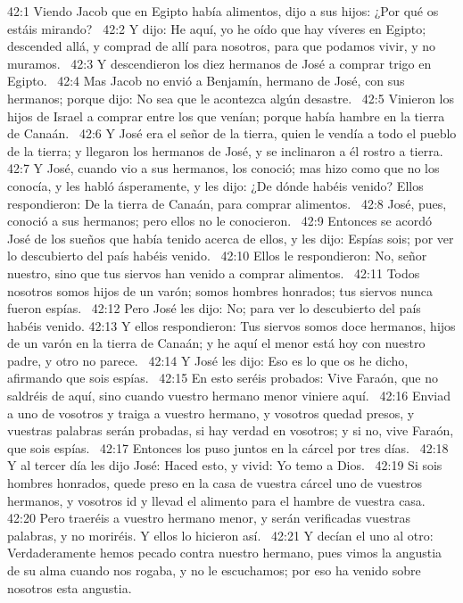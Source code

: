 42:1 Viendo Jacob que en Egipto había alimentos, dijo a sus hijos: ¿Por qué os estáis mirando?  
42:2 Y dijo: He aquí, yo he oído que hay víveres en Egipto; descended allá, y comprad de allí para nosotros, para que podamos vivir, y no muramos.  
42:3 Y descendieron los diez hermanos de José a comprar trigo en Egipto.  
42:4 Mas Jacob no envió a Benjamín, hermano de José, con sus hermanos; porque dijo: No sea que le acontezca algún desastre.  
42:5 Vinieron los hijos de Israel a comprar entre los que venían; porque había hambre en la tierra de Canaán.  
42:6 Y José era el señor de la tierra, quien le vendía a todo el pueblo de la tierra; y llegaron los hermanos de José, y se inclinaron a él rostro a tierra.  
42:7 Y José, cuando vio a sus hermanos, los conoció; mas hizo como que no los conocía, y les habló ásperamente, y les dijo: ¿De dónde habéis venido? Ellos respondieron: De la tierra de Canaán, para comprar alimentos.  
42:8 José, pues, conoció a sus hermanos; pero ellos no le conocieron.  
42:9 Entonces se acordó José de los sueños que había tenido acerca de ellos, y les dijo: Espías sois; por ver lo descubierto del país habéis venido.  
42:10 Ellos le respondieron: No, señor nuestro, sino que tus siervos han venido a comprar alimentos.  
42:11 Todos nosotros somos hijos de un varón; somos hombres honrados; tus siervos nunca fueron espías.  
42:12 Pero José les dijo: No; para ver lo descubierto del país habéis venido. 
42:13 Y ellos respondieron: Tus siervos somos doce hermanos, hijos de un varón en la tierra de Canaán; y he aquí el menor está hoy con nuestro padre, y otro no parece.  
42:14 Y José les dijo: Eso es lo que os he dicho, afirmando que sois espías.  
42:15 En esto seréis probados: Vive Faraón, que no saldréis de aquí, sino cuando vuestro hermano menor viniere aquí.  
42:16 Enviad a uno de vosotros y traiga a vuestro hermano, y vosotros quedad presos, y vuestras palabras serán probadas, si hay verdad en vosotros; y si no, vive Faraón, que sois espías.  
42:17 Entonces los puso juntos en la cárcel por tres días.  
42:18 Y al tercer día les dijo José: Haced esto, y vivid: Yo temo a Dios.  
42:19 Si sois hombres honrados, quede preso en la casa de vuestra cárcel uno de vuestros hermanos, y vosotros id y llevad el alimento para el hambre de vuestra casa.  
42:20 Pero traeréis a vuestro hermano menor, y serán verificadas vuestras palabras, y no moriréis. Y ellos lo hicieron así.  
42:21 Y decían el uno al otro: Verdaderamente hemos pecado contra nuestro hermano, pues vimos la angustia de su alma cuando nos rogaba, y no le escuchamos; por eso ha venido sobre nosotros esta angustia. 
